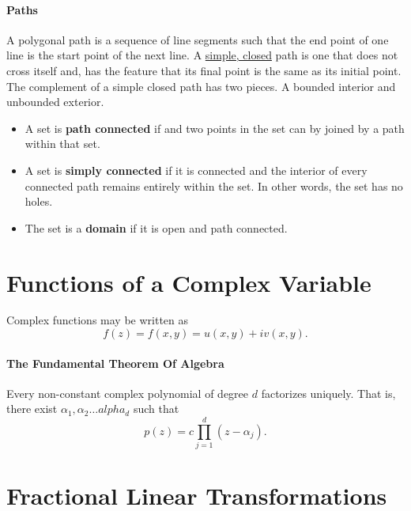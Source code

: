 \documentclass[12pt, letterpaper]{article}
\begin{document}
    \paragraph{Paths}
    A polygonal path is a sequence of line segments such that the end point of one line is the start point of the next line.
    A \underline{simple, closed} path is one that does not cross itself and, has the feature that its final point is the same as its initial point.
    The complement of a simple closed path has two pieces. A bounded interior and unbounded exterior.
    \begin{itemize}
        \item A set is \textbf{path connected} if and two points in the set can by joined by a path within that set.
        \item A set is \textbf{simply connected} if it is connected and the interior of every connected path remains entirely within the set. In other words, the set has no holes.
        \item The set is a \textbf{domain} if it is open and path connected.
    \end{itemize} 


    \section{Functions of a Complex Variable}

    Complex functions may be written as 
    \[f(z) = f(x,y) = u(x, y) + iv(x, y).\]

    \paragraph{The Fundamental Theorem Of Algebra}
    Every non-constant complex polynomial of degree \(d\) factorizes uniquely. That is, there exist \(\alpha_1, \alpha_2 \dots alpha_d\) such that 
    \[p(z) = c\prod_{j=1}^{d} (z-\alpha_j).\]


    \section{Fractional Linear Transformations}
\end{document}
